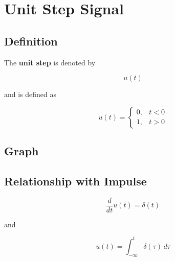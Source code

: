 
\section{Unit Step Signal}


\subsection{Definition}

The \textbf{unit step} is denoted by

\[
\boxed{
u(t)
}
\]

and is defined as

\[
u(t)=
\begin{cases}
0, & t<0\\
1, & t>0
\end{cases}
\]


\subsection{Graph}

\begin{center}
\end{center}


\subsection{Relationship with Impulse}

\[
\boxed{
\frac{d}{dt}u(t)=\delta(t)
}
\]

and

\[
\boxed{
u(t)=\int_{-\infty}^{t}\delta(\tau)\,d\tau
}
\]


